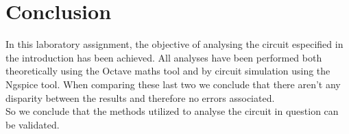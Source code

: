 \section{Conclusion}
\label{sec:conclusion}

In this laboratory assignment, the objective of analysing the circuit especified in the introduction has been
achieved. All analyses have been performed both theoretically using the Octave maths tool and by circuit simulation using the
Ngspice tool. When comparing these last two we conclude that there aren't any disparity between the results and therefore no errors associated.\\
So we conclude that the methods utilized to analyse the circuit in question can be validated.

